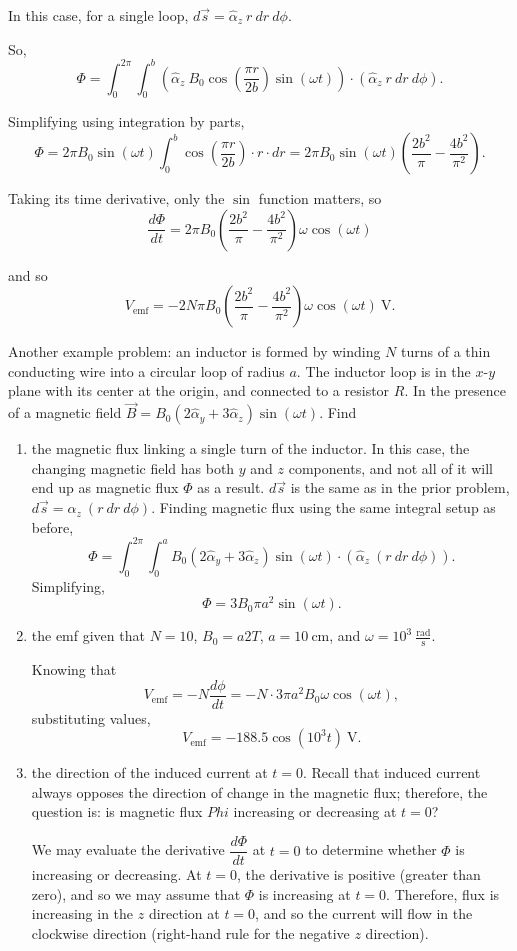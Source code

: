 \documentclass{article}
\begin{document}
In this case, for a single loop, \(d \vec{s} = \hat{\alpha}_z \ r \ dr \ d\phi\).

So, 
\[
	\Phi = \int_{0}^{2\pi} \int_{0}^{b} (\hat{\alpha}_z \ B_0 \cos{(\frac{\pi r}{2b})\sin{(\omega t)}}) \cdot (\hat{\alpha}_z \ r \ dr \ d\phi).
\]

Simplifying using integration by parts,
\[
	\Phi = 2\pi B_0 \sin{(\omega t)} \int_{0}^{b} \cos{(\frac{\pi r}{2b})} \cdot r \cdot dr = 2\pi B_0 \sin{(\omega t)}(\frac{2b^2}{\pi} - \frac{4b^2}{\pi^2}).
\]

Taking its time derivative, only the \(\sin\) function matters, so
\[
	\frac{d\Phi}{dt} = 2 \pi B_0(\frac{2b^2}{\pi} - \frac{4b^2}{\pi^2}) \omega \cos{(\omega t)}
\]

and so
\[
	V_{\mathrm{emf}} = -2 N \pi B_0(\frac{2b^2}{\pi} - \frac{4b^2}{\pi^2}) \omega \cos{(\omega t)} \ \mathrm{V}. 
\]

Another example problem: an inductor is formed by winding \(N\) turns of a thin conducting wire into a circular loop of radius \(a\). The inductor loop is in the \(x\)-\(y\) plane with its center at the origin, and connected to a resistor \(R\). In the presence of a magnetic field \(\vec{B} = B_0 (2 \hat{\alpha}_y + 3 \hat{\alpha}_z) \sin{(\omega t)}\). Find
\begin{enumerate}[label=\alph*)]
	\item the magnetic flux linking a single turn of the inductor.
		In this case, the changing magnetic field has both \(y\) and \(z\) components, and not all of it will end up as magnetic flux \(\Phi\) as a result. \(d \vec{s}\) is the same as in the prior problem, \(d \vec{s} = \hat{\alpha}_z \ (r \ dr \ d\phi)\). Finding magnetic flux using the same integral setup as before, 
		\[
			\Phi = \int_{0}^{2\pi}\int_{0}^{a} B_0 (2 \hat{\alpha}_y + 3 \hat{\alpha}_z)\sin{(\omega t)} \cdot (\hat{\alpha}_z \ (r \ dr \ d\phi)).
		\]
		Simplifying, 
		\[
			\Phi = 3B_0 \pi a^2 \sin{(\omega t)}.
		\]
	\item the emf given that \(N=10\), \(B_0 = a2T\), \(a=10 \ \mathrm{cm}\), and \(\omega=10^3 \ \mathrm{\frac{rad}{s}}\).

		Knowing that 
		\[
			V_{\mathrm{emf}} = -N \frac{d\phi}{dt} = -N \cdot 3 \pi a^2 B_0 \omega \cos{(\omega t)},
		\]
		substituting values, 
		\[
			V_{\mathrm{emf}} = -188.5 \cos{(10^3 t)} \ \mathrm{V}.
		\]
	\item the direction of the induced current at \(t=0\).
		Recall that induced current always opposes the direction of change in the magnetic flux; therefore, the question is: is magnetic flux \(Phi\) increasing or decreasing at \(t=0\)?

		We may evaluate the derivative \(\dfrac{d\Phi}{dt}\) at \(t=0\) to determine whether \(\Phi\) is increasing or decreasing. At \(t=0\), the derivative is positive (greater than zero), and so we may assume that \(\Phi\) is increasing at \(t=0\). Therefore, flux is increasing in the \(z\) direction at \(t=0\), and so the current will flow in the clockwise direction (right-hand rule for the negative \(z\) direction).
\end{enumerate}
\end{document}
